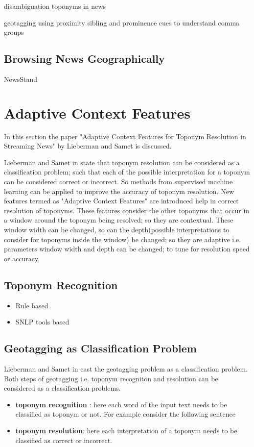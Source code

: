 \documentclass[
     11pt,         %
     a4paper,      %
     oneside,
     ]{article}
\begin{document}
disambiguation toponyms in news \cite{Garbin:2005:DTN:1220575.1220621}

geotagging using proximity sibling and prominence cues to understand comma groups \cite{Lieberman:2010:GUP:1722080.1722088}
\subsection{Browsing News Geographically} 
NewsStand \cite{Teitler:2008:NNV:1463434.1463458}


\section{Adaptive Context Features}\label{sec:acf}
In this section the paper "Adaptive Context Features for Toponym Resolution in Streaming News" \cite{Lieberman12adaptivecontext} by Lieberman and Samet is discussed. 

Lieberman and Samet in \cite{Lieberman12adaptivecontext} state that toponym resolution can be considered as a classification problem; such that each of the possible interpretation for a toponym can be considered correct or incorrect. So methods from supervised machine learning can be applied to improve the accuracy of toponym resolution. New features termed as "Adaptive Context Features" are introduced help in correct resolution of toponyms. These features consider the other toponyms that occur in a window around the toponym being resolved; so they are contextual. These window width can be changed, so can the depth(possible interpretations to consider for toponyms inside the window) be changed; so they are adaptive i.e. parameters window width and depth can be changed; to tune for resolution speed or accuracy.

\subsection{Toponym Recognition}\label{subsec:titlepage}
\begin{itemize}
	\item Rule based
	\item SNLP tools based
\end{itemize}
\subsection{Geotagging as Classification Problem}
Lieberman and Samet in \cite{Lieberman12adaptivecontext} cast the geotagging problem as a classification problem. Both steps of geotagging i.e. toponym recogniton and resolution can be considered as a classification problems.
\begin{itemize}
	\item \textbf{toponym recognition }: here each word of the input text needs to be classified as toponym or not. For example consider the following sentence
	\item \textbf{toponym resolution}: here each interpretation of a toponym needs to be classified as correct or incorrect.
\end{itemize}
\end{document}
